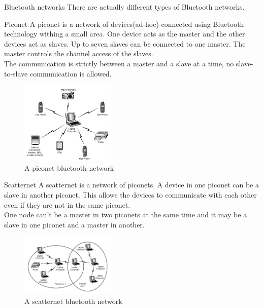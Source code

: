 \begin{section}{Bluetooth networks}
  There are actually different types of Bluetooth networks.
  \begin{subsection}{Piconet}
    A piconet is a network of devices(ad-hoc) connected using Bluetooth technology withing a small area. 
    One device acts as the master and the other devices act as slaves. Up to seven slaves can be 
    connected to one master. The master controls the channel access of the slaves.\\
    The communication is strictly between a master and a slave at a time, no slave-to-slave communication
    is allowed.\\
    \begin{figure}[H]
      \centering
      \includegraphics[width=0.4\textwidth]{img/wireless/piconet.png}
      \caption{A piconet bluetooth network}
    \end{figure}
  \end{subsection}

  \begin{subsection}{Scatternet}
    A scatternet is a network of piconets. A device in one piconet can be a slave in another piconet. 
    This allows the devices to communicate with each other even if they are not in the same piconet.\\
    One node can't be a master in two piconets at the same time and it may be a slave in one piconet and
    a master in another.\\
    \begin{figure}[H]
      \centering
      \includegraphics[width=0.4\textwidth]{img/wireless/scatternet.png}
      \caption{A scatternet bluetooth network}
    \end{figure}
  \end{subsection}


\end{section}
